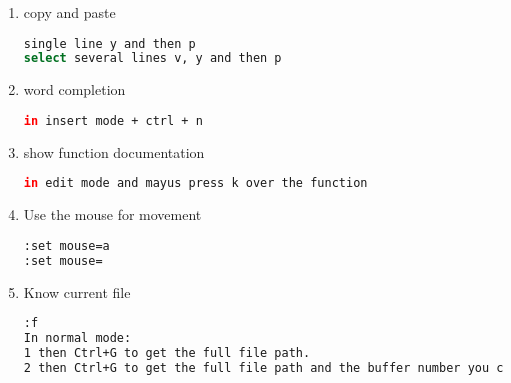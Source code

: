 \documentclass{article}
\begin{document}
\begin{enumerate}
\item  copy and paste
\begin{lstlisting}[language=bash]
single line y and then p
select several lines v, y and then p
\end{lstlisting}
\item  word  completion
\begin{lstlisting}[language=bash]
in insert mode + ctrl + n
\end{lstlisting}
\item  show function documentation
\begin{lstlisting}[language=bash]
in edit mode and mayus press k over the function
\end{lstlisting}
\item  Use the mouse for movement
\begin{lstlisting}[language=bash]
:set mouse=a
:set mouse=
\end{lstlisting}
\item Know current file
\begin{lstlisting}[language=bash]
:f
In normal mode: 
1 then Ctrl+G to get the full file path. 
2 then Ctrl+G to get the full file path and the buffer number you currently have open.
\end{lstlisting}

\end{enumerate}
\end{document}
